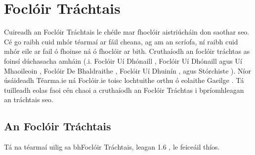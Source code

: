 \chapter{Foclóir Tráchtais} \label{appendix-focloir-trachtais}
Cuireadh an Foclóir Tráchtais le chéile mar fhoclóir aistriúcháin don saothar seo. Cé go raibh cuid mhór téarmaí ar fáil cheana, ag am an scríofa, ní raibh cuid mhór eile ar fail ó fhoinse ná ó fhoclóir ar bith. Cruthaíodh an foclóir tráchtas as foinsí dúchasacha amháin (.i. Foclóir Uí Dhónaill \cite{odonaill}, Foclóir Uí Dhónaill agus Uí Mhaoileoin \cite{focloir-beag}, Foclóir De Bhaldraithe \cite{de-bhaldraithe}, Foclóir Uí Dhuinín \cite{dineen}, agus Stórchiste \cite{storchiste}). Níor úsáideadh Téarma.ie \cite{tearmaie} ná Foclóir.ie \cite{omianain} toisc lochtuithe orthu ó eolaithe Gaeilge \cite{lang-change,diarmadose}. Tá tuilleadh eolas faoi cén chaoi a cruthaíodh an Foclóir Tráchtas i bpríomhleagan an tráchtais seo.

\section{An Foclóir Tráchtais} \label{focloir-trachtais-content}
Tá na téarmaí uilig sa bhFoclóir Tráchtais, leagan 1.6 \cite{focloir-trachtais}, le feiceáil thíos.

